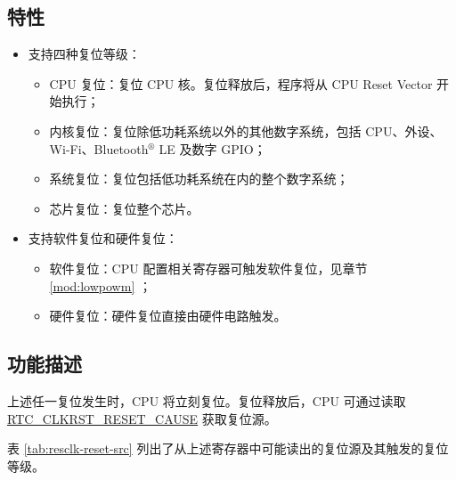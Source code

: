\documentclass[main\_\_CN.tex]{subfiles}
\begin{document}
\subsection{特性}
\label{sec:resclk-features}
\begin{itemize}
    \item 支持四种复位等级：
    \begin{itemize}
    \item CPU 复位：复位 CPU 核。复位释放后，程序将从 CPU Reset Vector 开始执行；
    \item 内核复位：复位除低功耗系统以外的其他数字系统，包括 CPU、外设、Wi-Fi、Bluetooth$^®$ LE 及数字 GPIO；
    \item 系统复位：复位包括低功耗系统在内的整个数字系统；
    \item 芯片复位：复位整个芯片。
    \end{itemize}
    \item 支持软件复位和硬件复位：
    \begin{itemize}
        \item 软件复位：CPU 配置相关寄存器可触发软件复位，见章节 \ref{mod:lowpowm} \textit{}；
        \item 硬件复位：硬件复位直接由硬件电路触发。
    \end{itemize}
\end{itemize}



\subsection{功能描述}
上述任一复位发生时，CPU 将立刻复位。复位释放后，CPU 可通过读取 \hyperref[fielddesc:RTCCLKRSTRESETCAUSE]{RTC\_CLKRST\_RESET\_CAUSE} 获取复位源。

表 \ref{tab:resclk-reset-src} 列出了从上述寄存器中可能读出的复位源及其触发的复位等级。
\end{document}
